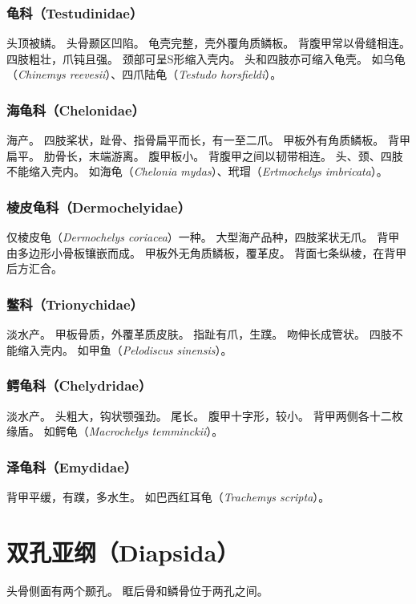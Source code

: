 \documentclass[11pt]{article}
\begin{document}
\subsubsection{龟科（Testudinidae）}
头顶被鳞。
头骨颞区凹陷。
龟壳完整，壳外覆角质鳞板。
背腹甲常以骨缝相连。
四肢粗壮，爪钝且强。
颈部可呈S形缩入壳内。
头和四肢亦可缩入龟壳。
如乌龟（\textit{Chinemys reevesii}）、四爪陆龟（\textit{Testudo horsfieldi}）。

\subsubsection{海龟科（Chelonidae）}
海产。
四肢桨状，趾骨、指骨扁平而长，有一至二爪。
甲板外有角质鳞板。
背甲扁平。
肋骨长，末端游离。
腹甲板小。
背腹甲之间以韧带相连。
头、颈、四肢不能缩入壳内。
如海龟（\textit{Chelonia mydas}）、玳瑁（\textit{Ertmochelys imbricata}）。

\subsubsection{棱皮龟科（Dermochelyidae）}
仅棱皮龟（\textit{Dermochelys coriacea}）一种。
大型海产品种，四肢桨状无爪。
背甲由多边形小骨板镶嵌而成。
甲板外无角质鳞板，覆革皮。
背面七条纵棱，在背甲后方汇合。

\subsubsection{鳖科（Trionychidae）}
淡水产。
甲板骨质，外覆革质皮肤。
指趾有爪，生蹼。
吻伸长成管状。
四肢不能缩入壳内。
如甲鱼（\textit{Pelodiscus sinensis}）。

\subsubsection{鳄龟科（Chelydridae）}
淡水产。
头粗大，钩状颚强劲。
尾长。
腹甲十字形，较小。
背甲两侧各十二枚缘盾。
如鳄龟（\textit{Macrochelys temminckii}）。

\subsubsection{泽龟科（Emydidae）}
背甲平缓，有蹼，多水生。
如巴西红耳龟（\textit{Trachemys scripta}）。

\section{双孔亚纲（Diapsida）}
头骨侧面有两个颞孔。
眶后骨和鳞骨位于两孔之间。
\end{document}

